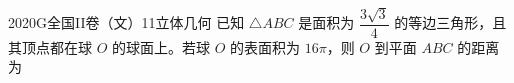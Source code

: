 
\begin{problem}{2020}{G}{全国II卷（文）}{11}{立体几何}
已知 $ \triangle ABC $ 是面积为 $ \dfrac{3\sqrt{3}}{4} $ 的等边三角形，且其顶点都在球 $ O $ 的球面上。若球 $ O $ 的表面积为 $ 16\pi $，则 $ O $ 到平面 $ ABC $ 的距离为
\begin{choices}
\end{choices}
\end{problem}

\begin{answer}

\end{answer}

\begin{solutions}

\end{solutions}
